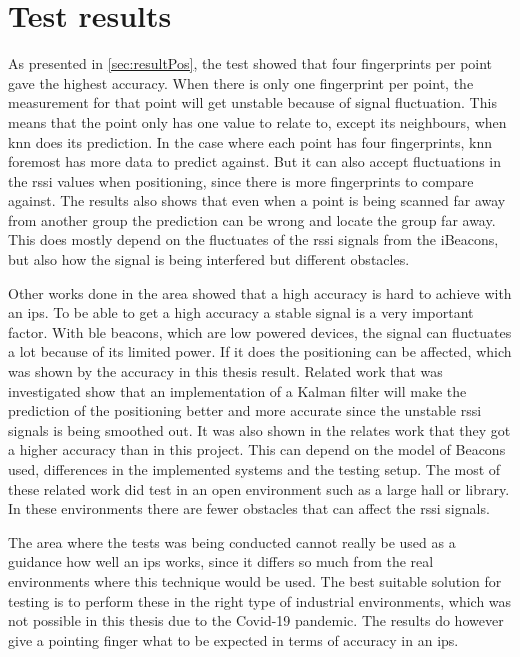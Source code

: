 \section{Test results}\label{sec:discussionResult}
As presented in \cref{sec:resultPos}, the test showed that four fingerprints per point gave the highest accuracy.
When there is only one fingerprint per point, the measurement for that point will get unstable because of signal fluctuation.
This means that the point only has one value to relate to, except its neighbours, when \acrshort{knn} does its prediction.
In the case where each point has four fingerprints, \acrshort{knn} foremost has more data to predict against.
But it can also accept fluctuations in the \acrshort{rssi} values when positioning, since there is more fingerprints to compare against.
The results also shows that even when a point is being scanned far away from another group the prediction can be wrong and locate the group far away.
This does mostly depend on the fluctuates of the \acrshort{rssi} signals from the iBeacons, but also how the signal is being interfered but different obstacles.

\bigskip

Other works done in the area showed that a high accuracy is hard to achieve with an \acrshort{ips}.
To be able to get a high accuracy a stable signal is a very important factor.
With \acrshort{ble} beacons, which are low powered devices, the signal can fluctuates a lot because of its limited power.
If it does the positioning can be affected, which was shown by the accuracy in this thesis result.
Related work that was investigated show that an implementation of a Kalman filter will make the prediction of the positioning better and more accurate since the unstable \acrshort{rssi} signals is being smoothed out.
It was also shown in the relates work that they got a higher accuracy than in this project.
This can depend on the model of Beacons used, differences in the implemented systems and the testing setup.
The most of these related work did test in an open environment such as a large hall or library.
In these environments there are fewer obstacles that can affect the \acrshort{rssi} signals.

\bigskip

The area where the tests was being conducted cannot really be used as a guidance how well an \acrshort{ips} works, since it differs so much from the real environments where this technique would be used.
The best suitable solution for testing is to perform these in the right type of industrial environments, which was not possible in this thesis due to the Covid-19 pandemic.
The results do however give a pointing finger what to be expected in terms of accuracy in an \acrshort{ips}.


